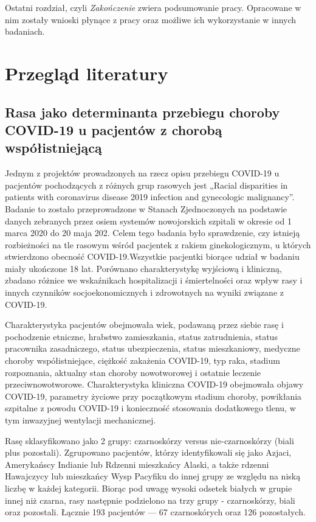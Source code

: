 \documentclass[polish, twoside, 12pt, a4paper]{article}
\theoremstyle{definition}
\theoremstyle{plain}
\theoremstyle{remark}
\begin{document}
Ostatni rozdział, czyli \emph{Zakończenie} zwiera podsumowanie pracy. Opracowane w nim zostały wnioski płynące z pracy oraz możliwe ich wykorzystanie w innych badaniach.


\cleardoublepage
\section{Przegląd literatury}
\label{chapter:przeglad-literatury}


\subsection{Rasa jako determinanta przebiegu choroby COVID-19 u pacjentów z chorobą współistniejącą}

Jednym z projektów prowadzonych na rzecz opisu przebiegu COVID-19 u pacjentów pochodzących z różnych grup rasowych jest „Racial disparities in patients with coronavirus disease 2019 infection and gynecologic malignancy”. Badanie to zostało przeprowadzone w Stanach Zjednoczonych na podstawie danych zebranych przez osiem systemów nowojorskich szpitali w okresie od 1 marca 2020 do 20 maja 202. Celem tego badania było sprawdzenie, czy istnieją rozbieżności na tle rasowym wśród pacjentek z rakiem ginekologicznym, u których stwierdzono obecność COVID-19.Wszystkie pacjentki biorące udział w badaniu miały ukończone 18 lat. Porównano charakterystykę wyjściową i kliniczną, zbadano różnice we wskaźnikach hospitalizacji i śmiertelności oraz wpływ rasy i innych czynników socjoekonomicznych i zdrowotnych na wyniki związane z COVID-19. 

Charakterystyka pacjentów obejmowała wiek, podawaną przez siebie rasę i pochodzenie etniczne, hrabstwo zamieszkania, status zatrudnienia, status pracownika zasadniczego, status ubezpieczenia, status mieszkaniowy, medyczne choroby współistniejące, ciężkość zakażenia COVID-19, typ raka, stadium rozpoznania, aktualny stan choroby nowotworowej i ostatnie leczenie przeciwnowotworowe.  Charakterystyka kliniczna COVID-19 obejmowała objawy COVID-19, parametry życiowe przy początkowym stadium choroby, powikłania szpitalne z powodu COVID-19 i konieczność stosowania dodatkowego tlenu, w tym inwazyjnej wentylacji mechanicznej. 

Rasę sklasyfikowano jako 2 grupy: czarnoskórzy versus nie-czarnoskórzy (biali plus pozostali). Zgrupowano pacjentów, którzy identyfikowali się jako Azjaci, Amerykańscy Indianie lub Rdzenni mieszkańcy Alaski, a także rdzenni Hawajczycy lub mieszkańcy Wysp Pacyfiku do innej grupy ze względu na niską liczbę w każdej kategorii. Biorąc pod uwagę wysoki odsetek białych w grupie innej niż czarna, rasy następnie podzielono na trzy grupy - czarnoskórzy, biali oraz pozostali. Łącznie 193 pacjentów --- 67 czarnoskórych oraz 126 pozostałych.
\end{document}
